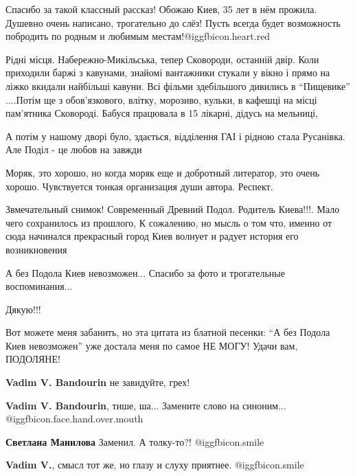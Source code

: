 \begin{itemize}

Спасибо за такой классный рассказ! Обожаю Киев, 35 лет в нём прожила. Душевно
очень написано, трогательно до слёз! Пусть всегда будет возможность побродить
по родным и любимым местам!@igg{fbicon.heart.red}


Рідні місця. Набережно-Микільська, тепер Сковороди, останній двір. Коли
приходили баржі з кавунами, знайомі вантажники стукали у вікно і прямо на ліжко
вкидали найбільші кавуни. Всі фільми здебільшого дивились в \enquote{Пищевике} ....Потім
ще з обов'язкового, влітку, морозиво, кульки, в кафешці на місці пам'ятника
Сковороді. Бабуся працювала в 15 лікарні, дідусь на мельниці,

А потім у нашому дворі було, здається, відділення ГАІ і рідною стала Русанівка.
Але Поділ - це любов на завжди


Моряк, это хорошо, но когда моряк еще и добротный литератор, это очень хорошо.
Чувствуется тонкая организация души автора. Респект.


Звмечательный снимок! Современный Древний Подол.  Родитель Киева!!!. Мало чего
сохранилось из прошлого, К сожалению, но мысль о том что, именно от сюда
начинался прекрасный город Киев волнует и радует история его возникновения


А без Подола Киев невозможен... Спасибо за фото и трогательные воспоминания...

Дякую!!!


Вот можете меня забанить, но эта цитата из блатной песенки: \enquote{А без Подола Киев
невозможен} уже достала меня по самое НЕ МОГУ! Удачи вам, ПОДОЛЯНЕ!

\begin{itemize} %
\textbf{Vadim V. Bandourin} не завидуйте, грех!

\textbf{Vadim V. Bandourin}, тише, ша... Замените слово на синоним... @igg{fbicon.face.hand.over.mouth} 

\begin{itemize} %
\textbf{Светлана Манилова} Заменил. А толку-то?!  @igg{fbicon.smile} 

\textbf{Vadim V.}, смысл тот же, но глазу и слуху приятнее. @igg{fbicon.smile} 


\end{itemize}
\end{itemize}
\end{itemize}
